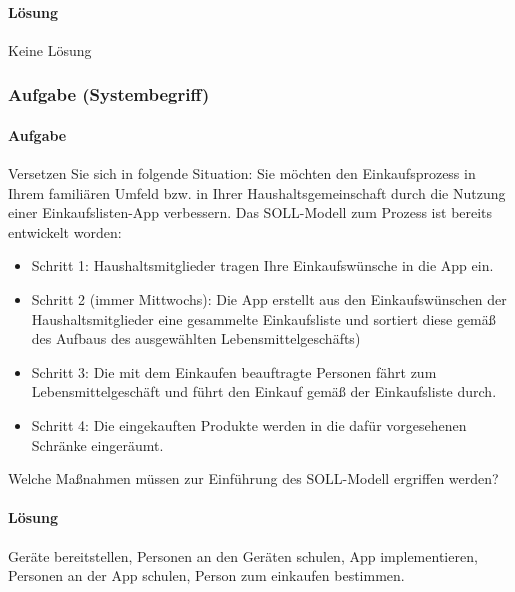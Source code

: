 \paragraph*{Lösung}
    Keine Lösung


\subsubsection*{Aufgabe (Systembegriff)}
\paragraph*{Aufgabe}
    Versetzen Sie sich in folgende Situation: Sie möchten den Einkaufsprozess in Ihrem familiären Umfeld bzw. in Ihrer Haushaltsgemeinschaft durch die Nutzung einer Einkaufslisten-App verbessern. Das SOLL-Modell zum Prozess ist bereits entwickelt worden:
   
    \begin{itemize}
        \item Schritt 1: Haushaltsmitglieder tragen Ihre Einkaufswünsche in die App ein.
        \item Schritt 2 (immer Mittwochs): Die App erstellt aus den Einkaufswünschen der Haushaltsmitglieder eine gesammelte Einkaufsliste und sortiert diese gemäß des Aufbaus des ausgewählten Lebensmittelgeschäfts)
        \item Schritt 3: Die mit dem Einkaufen beauftragte Personen fährt zum Lebensmittelgeschäft und führt den Einkauf gemäß der Einkaufsliste durch.
        \item Schritt 4: Die eingekauften Produkte werden in die dafür vorgesehenen Schränke eingeräumt.
    \end{itemize}

    Welche Maßnahmen müssen zur Einführung des SOLL-Modell ergriffen werden?
\paragraph*{Lösung}
    Geräte bereitstellen, Personen an den Geräten schulen, App implementieren, Personen an der App schulen, Person zum einkaufen bestimmen.

